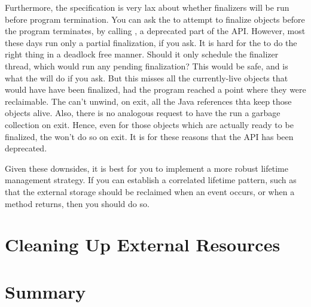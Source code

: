 Furthermore, the specification is very lax about whether finalizers will be run
before program termination. You can ask the \jre to attempt to finalize objects
before the program terminates, by calling
, a deprecated part of the API. However,
most \jres these days run only a partial finalization, if you ask. It is hard for
the \jre to do the right thing in a deadlock free manner. Should it only schedule
the finalizer thread, which would run any pending finalization? This would be
safe, and is what the \jre will do if you ask. But this misses all the
currently-live objects that would have have been finalized, had the program
reached a point where they were reclaimable. The \jre can't unwind, on exit, all
the Java references thta keep those objects alive. Also, there is no analogous
request to have the \jre run a garbage collection on exit. Hence, even for those
objects which are actually ready to be finalized, the \jre won't do so on exit.
It is for these reasons that the API has been deprecated.

Given these downsides, it is best for you to implement a more robust lifetime
management strategy. If you can establish a correlated lifetime pattern, such as
that the external storage should be reclaimed when an event occurs, or when a
method returns, then you should do so.

\section{Cleaning Up External Resources}
\label{sec:external-resources-details}


\section{Summary}



